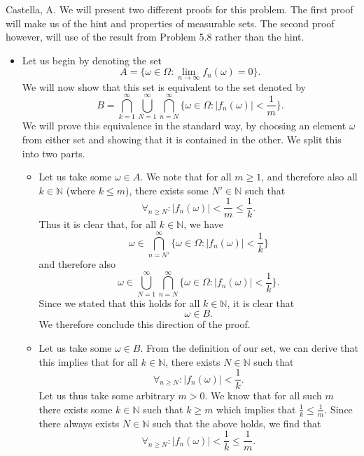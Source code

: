 \begin{solution}[5.7]{Castella, A.}
    We will present two different proofs for this problem. The first proof will make us of the hint and properties of measurable sets. The second proof however, will use of the result from Problem 5.8 rather than the hint.
    \begin{itemize}
        \item Let us begin by denoting the set
        $$
            A = \{\omega \in \Omega : \lim_{n\rightarrow\infty}f_n(\omega) = 0\}.
        $$
        We will now show that this set is equivalent to the set denoted by
        $$
            B = \bigcap_{k=1}^\infty\bigcup_{N=1}^\infty\bigcap_{n=N}^\infty\{\omega \in \Omega : |f_n(\omega)| < \frac{1}{m}\}.
        $$
        We will prove this equivalence in the standard way, by choosing an element $\omega$ from either set and showing that it is contained in the other. We split this into two parts.
        \begin{itemize}
            \item Let us take some $\omega \in A$. We note that for all $m \geq 1$, and therefore also all $k \in \mathbb{N}$ (where $k \leq m$), there exists some $N' \in \mathbb{N}$ such that
            $$
                \forall_{n \geq N}: |f_n(\omega)| < \frac{1}{m} \leq \frac{1}{k}.
            $$
            Thus it is clear that, for all $k \in \mathbb{N}$, we have
            $$
                \omega \in \bigcap_{n = N'}^\infty\{\omega \in \Omega : |f_n(\omega)| < \frac{1}{k}\}
            $$
            and therefore also
            $$
                \omega \in \bigcup_{N=1}^\infty\bigcap_{n = N}^\infty\{\omega \in \Omega : |f_n(\omega)| < \frac{1}{k}\}.
            $$
            Since we stated that this holds for all $k \in \mathbb{N}$, it is clear that
            $$
                \omega \in B.
            $$
            We therefore conclude this direction of the proof.
            \item Let us take some $\omega \in B$. From the definition of our set, we can derive that this implies that for all $k \in \mathbb{N}$, there exists $N \in \mathbb{N}$ such that
            $$
                \forall_{n \geq N}: |f_n(\omega)| < \frac{1}{k}.
            $$
            Let us thus take some arbitrary $m > 0$. We know that for all such $m$ there exists some $k \in \mathbb{N}$ such that $k \geq m$ which implies that $\frac{1}{k} \leq \frac{1}{m}$. Since there always exists $N \in \mathbb{N}$ such that the above holds, we find that
            $$
                \forall_{n \geq N}: |f_n(\omega)| < \frac{1}{k} \leq \frac{1}{m}.
$$
\end{itemize}
\end{itemize}
\end{solution}
